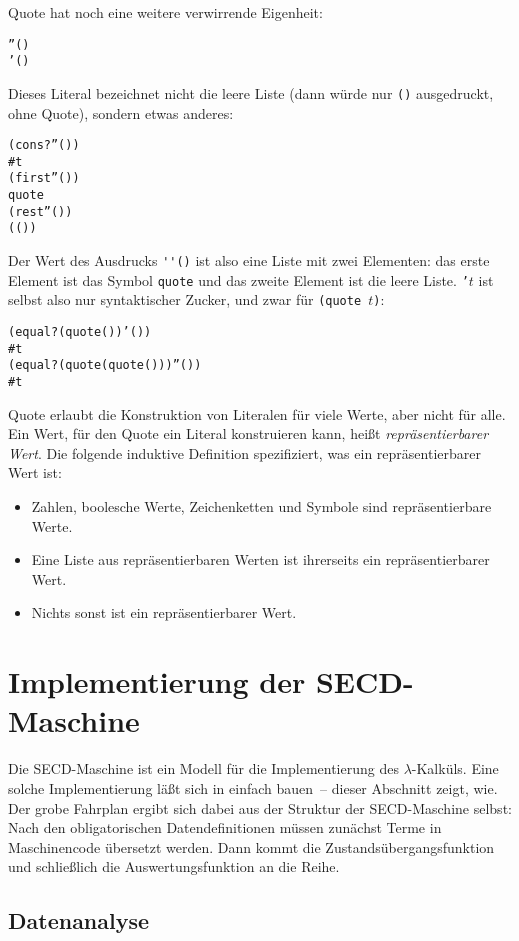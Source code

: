 Quote hat noch eine weitere verwirrende Eigenheit:
%
\begin{alltt}
''()
\evalsto{} '()
\end{alltt}
%
Dieses Literal bezeichnet nicht die leere Liste (dann würde nur
\texttt{()} ausgedruckt, ohne Quote), sondern etwas anderes:
%
\begin{alltt}
(cons? ''())
\evalsto{} #t
(first ''())
\evalsto{} quote
(rest ''())
\evalsto{} (())
\end{alltt}
%
Der Wert des Ausdrucks \verb|''()| ist also eine Liste mit zwei
Elementen: das erste Element ist das Symbol \texttt{quote} und das
zweite Element ist die leere Liste.  \texttt{'$t$}
ist selbst also nur syntaktischer Zucker, und zwar für \texttt{(quote
  $t$)}:
%
\begin{alltt}
(equal? (quote ()) '())
\evalsto{} #t
(equal? (quote (quote ())) ''())
\evalsto{} #t
\end{alltt}
%
Quote erlaubt die Konstruktion von Literalen für viele Werte, aber
nicht für alle.  Ein Wert, für den Quote ein Literal konstruieren kann,
heißt \textit{repräsentierbarer
  Wert}.  Die folgende induktive
Definition spezifiziert, was ein repräsentierbarer Wert ist:
%
\begin{itemize}
\item Zahlen, boolesche Werte, Zeichenketten und Symbole sind
  repräsentierbare Werte.
\item Eine Liste aus repräsentierbaren Werten ist ihrerseits ein
  repräsentierbarer Wert. 
\item Nichts sonst ist ein repräsentierbarer Wert.
\end{itemize}

\section{Implementierung der SECD-Maschine}

Die SECD-Maschine ist ein Modell für die Implementierung des
$\lambda$-Kalküls.  Eine solche Implementierung läßt sich in
einfach bauen~-- dieser Abschnitt zeigt, wie.  Der grobe
Fahrplan ergibt sich dabei aus der Struktur der SECD-Maschine selbst:
Nach den obligatorischen Datendefinitionen müssen zunächst Terme in
Maschinencode übersetzt werden.  Dann kommt die
Zustandsübergangsfunktion und schließlich die Auswertungsfunktion an
die Reihe.

\subsection{Datenanalyse}
\label{sec:secd-datenanalyse}


